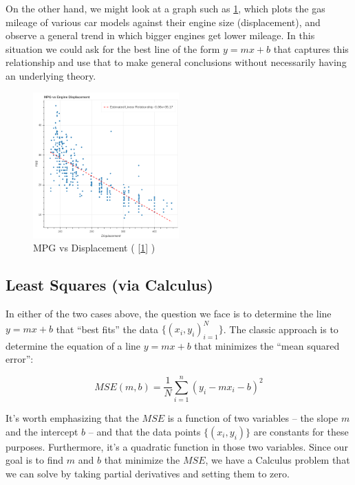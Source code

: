 \documentclass[
]{article}
\begin{document}
On the other hand, we might look at a graph such as
\cref{fig:mpg-vs-displacement}, which plots the gas mileage of various
car models against their engine size (displacement), and observe a
general trend in which bigger engines get lower mileage. In this
situation we could ask for the best line of the form \(y=mx+b\) that
captures this relationship and use that to make general conclusions
without necessarily having an underlying theory.

\begin{figure}
\hypertarget{fig:mpg-vs-displacement}{%
\centering
\includegraphics[width=0.5\textwidth,height=\textheight]{../img/mpg-vs-displacement.png}
\caption{MPG vs Displacement ( {[}\protect\hyperlink{ref-irvine}{1}{]}
)}\label{fig:mpg-vs-displacement}
}
\end{figure}

\hypertarget{sec:Calculus}{%
\subsection{Least Squares (via Calculus)}\label{sec:Calculus}}

In either of the two cases above, the question we face is to determine
the line \(y=mx+b\) that ``best fits'' the data
\(\{(x_i,y_i)_{i=1}^{N}\}\). The classic approach is to determine the
equation of a line \(y=mx+b\) that minimizes the ``mean squared error'':

\[ MSE(m,b) = \frac{1}{N}\sum_{i=1}^{n} (y_i-mx_i-b)^2 \]

It's worth emphasizing that the \(MSE\) is a function of two variables
-- the slope \(m\) and the intercept \(b\) -- and that the data points
\(\{(x_i,y_i)\}\) are constants for these purposes. Furthermore, it's a
quadratic function in those two variables. Since our goal is to find
\(m\) and \(b\) that minimize the \(MSE\), we have a Calculus problem
that we can solve by taking partial derivatives and setting them to
zero.
\end{document}
